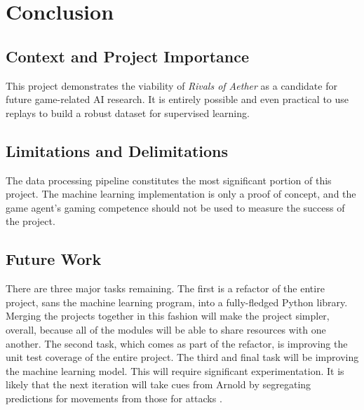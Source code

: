 \chapter{Conclusion}


\section{Context and Project Importance}

This project demonstrates the viability of \textit{Rivals of Aether} as a candidate for future game-related AI research. It is entirely possible and even practical to use replays to build a robust dataset for supervised learning.



\section{Limitations and Delimitations}

The data processing pipeline constitutes the most significant portion of this project. The machine learning implementation is only a proof of concept, and the game agent's gaming competence should not be used to measure the success of the project.



\section{Future Work}

There are three major tasks remaining. The first is a refactor of the entire project, sans the machine learning program, into a fully-fledged Python library. Merging the projects together in this fashion will make the project simpler, overall, because all of the modules will be able to share resources with one another. The second task, which comes as part of the refactor, is improving the unit test coverage of the entire project. The third and final task will be improving the machine learning model. This will require significant experimentation. It is likely that the next iteration will take cues from Arnold by segregating predictions for movements from those for attacks \cite{Chaplot}.

